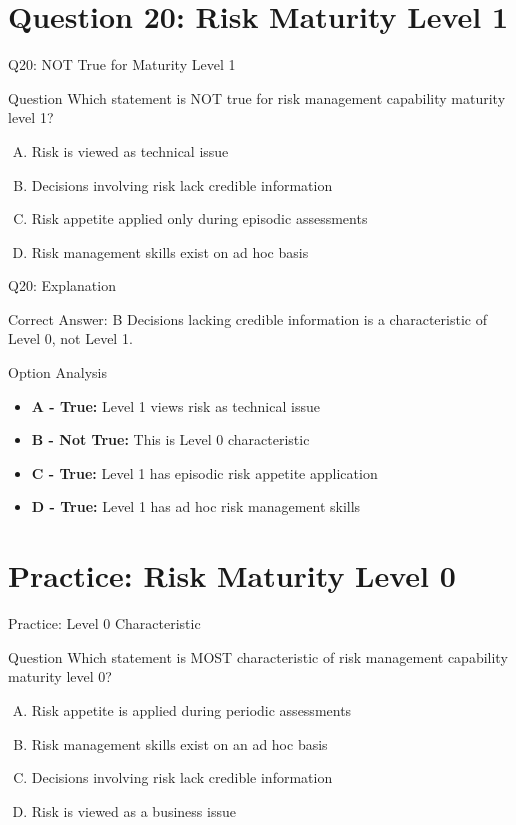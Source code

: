 \documentclass{beamer}
\begin{document}
	\section{Question 20: Risk Maturity Level 1}
	
	\begin{frame}{Q20: NOT True for Maturity Level 1}
		\begin{block}{Question}
			Which statement is NOT true for risk management capability maturity level 1?
		\end{block}
		\begin{enumerate}[(A)]
			\item Risk is viewed as technical issue
			\item Decisions involving risk lack credible information
			\item Risk appetite applied only during episodic assessments
			\item Risk management skills exist on ad hoc basis
		\end{enumerate}
	\end{frame}
	
	\begin{frame}{Q20: Explanation}
		\begin{block}{Correct Answer: B}
			Decisions lacking credible information is a characteristic of Level 0, not Level 1.
		\end{block}
		\begin{block}{Option Analysis}
			\begin{itemize}
				\item \textbf{A - True:} Level 1 views risk as technical issue
				\item \textbf{B - Not True:} This is Level 0 characteristic
				\item \textbf{C - True:} Level 1 has episodic risk appetite application
				\item \textbf{D - True:} Level 1 has ad hoc risk management skills
			\end{itemize}
		\end{block}
	\end{frame}
	
	

	\section{Practice: Risk Maturity Level 0}
	
	\begin{frame}{Practice: Level 0 Characteristic}
		\begin{block}{Question}
			Which statement is MOST characteristic of risk management capability maturity level 0?
		\end{block}
		\begin{enumerate}[(A)]
			\item Risk appetite is applied during periodic assessments
			\item Risk management skills exist on an ad hoc basis
			\item Decisions involving risk lack credible information
			\item Risk is viewed as a business issue
		\end{enumerate}
	\end{frame}
	
\end{document}
